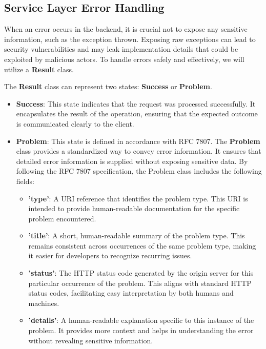 \subsection{Service Layer Error Handling}

When an error occurs in the backend, it is crucial not to expose any sensitive information, such as the exception thrown. Exposing raw exceptions can lead to security vulnerabilities and may leak implementation details that could be exploited by malicious actors. To handle errors safely and effectively, we will utilize a \textbf{Result} class.

The \textbf{Result} class can represent two states: \textbf{Success} or \textbf{Problem}.
\begin{itemize}
	\item \textbf{Success}: This state indicates that the request was processed successfully. It encapsulates the result of the operation, ensuring that the expected outcome is communicated clearly to the client.
	\item \textbf{Problem}: This state is defined in accordance with RFC 7807\cite{rfc7807}. The \textbf{Problem} class provides a standardized way to convey error information. It ensures that detailed error information is supplied without exposing sensitive data. By following the RFC 7807 specification, the Problem class includes the following fields:
	\begin{itemize}
		\item \textbf{'type'}: A URI reference that identifies the problem type. This URI is intended to provide human-readable documentation for the specific problem encountered.
		\item \textbf{'title'}: A short, human-readable summary of the problem type. This remains consistent across occurrences of the same problem type, making it easier for developers to recognize recurring issues.
		\item \textbf{'status'}:  The HTTP status code generated by the origin server for this particular occurrence of the problem. This aligns with standard HTTP status codes, facilitating easy interpretation by both humans and machines.
		\item \textbf{'details'}: A human-readable explanation specific to this instance of the problem. It provides more context and helps in understanding the error without revealing sensitive information.
	\end{itemize}
\end{itemize}

